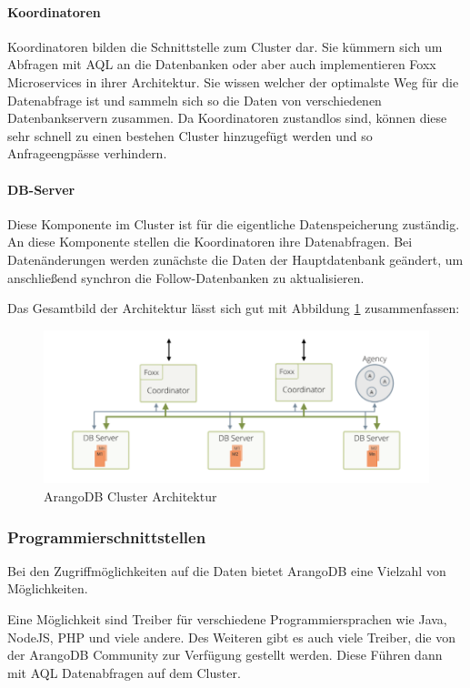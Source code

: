 \paragraph{Koordinatoren}
Koordinatoren bilden die Schnittstelle zum Cluster dar. Sie kümmern sich um Abfragen mit \ac{AQL} an die Datenbanken oder aber auch implementieren Foxx Microservices in ihrer Architektur. Sie wissen welcher der optimalste Weg für die Datenabfrage ist und sammeln sich so die Daten von verschiedenen Datenbankservern zusammen. Da Koordinatoren zustandlos sind, können diese sehr schnell zu einen bestehen Cluster hinzugefügt werden und so Anfrageengpässe verhindern. \cite{ADB_clusterarch}
\paragraph{DB-Server} 
Diese Komponente im Cluster ist für die eigentliche Datenspeicherung zuständig. An diese Komponente stellen die Koordinatoren ihre Datenabfragen. Bei Datenänderungen werden zunächste die Daten der Hauptdatenbank geändert, um anschließend synchron die Follow-Datenbanken zu aktualisieren.

Das Gesamtbild der Architektur lässt sich gut mit Abbildung \ref{fig:ClusterArch} zusammenfassen:
\begin{figure}[htbp] 
  	\centering
     \includegraphics[width=1\textwidth]{./images/cluster-arch.png}
 	\caption{ArangoDB Cluster Architektur \cite{ADB_clusterarch}}
  \label{fig:ClusterArch}
\end{figure}


\subsubsection{Programmierschnittstellen}
Bei den Zugriffmöglichkeiten auf die Daten bietet ArangoDB eine Vielzahl von Möglichkeiten.

Eine Möglichkeit sind Treiber für verschiedene Programmiersprachen wie Java, NodeJS, PHP und viele andere. Des Weiteren gibt es auch viele Treiber, die von der ArangoDB Community zur Verfügung gestellt werden. \cite{ADB_driver} Diese Führen dann mit \ac{AQL} Datenabfragen auf dem Cluster. 

